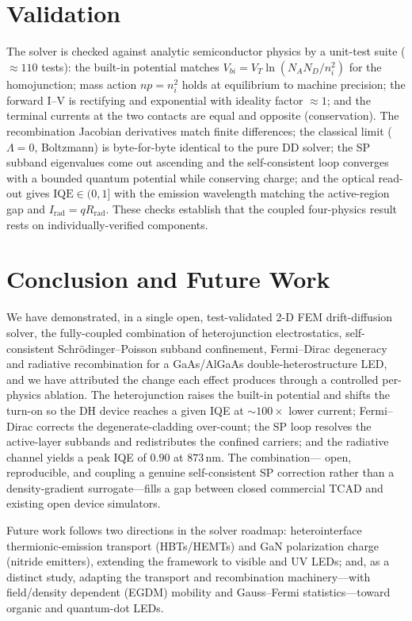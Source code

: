 \documentclass[conference]{IEEEtran}
\begin{document}
\section{Validation}
The solver is checked against analytic semiconductor physics by a unit-test suite
($\approx110$ tests): the built-in potential matches
$V_{bi}=V_T\ln(N_A N_D/n_i^2)$ for the homojunction; mass action $np=n_i^2$ holds
at equilibrium to machine precision; the forward I--V is rectifying and
exponential with ideality factor $\approx1$; and the terminal currents at the two
contacts are equal and opposite (conservation). The recombination Jacobian
derivatives match finite differences; the classical limit ($\Lambda=0$, Boltzmann)
is byte-for-byte identical to the pure DD solver; the SP subband eigenvalues come
out ascending and the self-consistent loop converges with a bounded quantum
potential while conserving charge; and the optical read-out gives
$\mathrm{IQE}\in(0,1]$ with the emission wavelength matching the active-region gap
and $I_{\mathrm{rad}}=qR_{\mathrm{rad}}$. These checks establish that the coupled
four-physics result rests on individually-verified components.

\section{Conclusion and Future Work}
We have demonstrated, in a single open, test-validated 2-D FEM drift-diffusion
solver, the fully-coupled combination of heterojunction electrostatics,
self-consistent Schr\"odinger--Poisson subband confinement, Fermi--Dirac
degeneracy and radiative recombination for a GaAs/AlGaAs double-heterostructure
LED, and we have attributed the change each effect produces through a controlled
per-physics ablation. The heterojunction raises the built-in potential and shifts
the turn-on so the DH device reaches a given IQE at $\sim\!100\times$ lower
current; Fermi--Dirac corrects the degenerate-cladding over-count; the SP loop
resolves the active-layer subbands and redistributes the confined carriers; and
the radiative channel yields a peak IQE of $0.90$ at $873\,$nm. The combination---%
open, reproducible, and coupling a genuine self-consistent SP correction rather
than a density-gradient surrogate---fills a gap between closed commercial TCAD and
existing open device simulators.

Future work follows two directions in the solver roadmap: heterointerface
thermionic-emission transport (HBTs/HEMTs) and GaN polarization charge (nitride
emitters), extending the framework to visible and UV LEDs; and, as a distinct
study, adapting the transport and recombination machinery---with field/density
dependent (EGDM) mobility and Gauss--Fermi statistics---toward organic and
quantum-dot LEDs.
\end{document}
